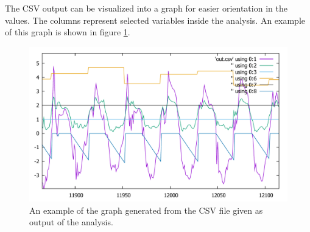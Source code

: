 The \ac{CSV} output can be visualized into a graph for easier orientation in the values. The columns represent selected variables inside the analysis. An example of this graph is shown in figure \ref{fig:graphSelectedAnalysis}.

\begin{figure}[H]
	\centering
	\caption{An example of the graph generated from the CSV file given as output of the analysis.}
	\label{fig:graphSelectedAnalysis}
	\includegraphics[width=\linewidth]{img/outputHorseAnalysisZoom.pdf}
\end{figure}
